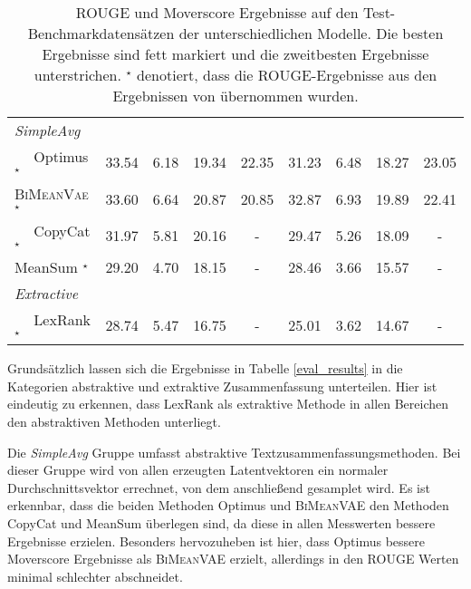 \begin{table}[!h]
\begin{tabular}{@{}lcccccccc@{}}
    \textit{SimpleAvg}         &         &         &        &      &  &        &        \\
    $\quad$ Optimus  $^{\star}$          & 33.54   & 6.18    & 19.34 & 22.35& 31.23  & 6.48   & 18.27 & 23.05\\
    $\quad$ \textsc{BiMeanVae}$^{\star}$ & 33.60   & 6.64    & 20.87 & 20.85& 32.87  & 6.93   & 19.89 & 22.41\\
    $\quad$ CopyCat  $^{\star}$          & 31.97   & 5.81    & 20.16 &- & 29.47  & 5.26   & 18.09 & -\\ 
    $\quad$ MeanSum  $^{\star}$          & 29.20   & 4.70    & 18.15 & -& 28.46  & 3.66   & 15.57 & -\\ \midrule
    \textit{Extractive}        &         &         &        &      &  &        &  &      \\
    $\quad$ LexRank  $^{\star}$          & 28.74   & 5.47    & 16.75 & -& 25.01  & 3.62   & 14.67 & -\\ \bottomrule
    \end{tabular}
    \caption{ROUGE und Moverscore Ergebnisse auf den Test-Benchmarkdatensätzen der unterschiedlichen Modelle. Die besten Ergebnisse sind fett markiert und die zweitbesten Ergebnisse unterstrichen.
    $^{\star}$ denotiert, dass die ROUGE-Ergebnisse aus den Ergebnissen von \citep{coop} übernommen wurden.
    }
\end{table}

Grundsätzlich lassen sich die Ergebnisse in Tabelle \ref{eval_results} in die Kategorien abstraktive und extraktive Zusammenfassung unterteilen.
Hier ist eindeutig zu erkennen, dass LexRank als extraktive Methode in allen Bereichen den abstraktiven Methoden unterliegt.

Die \textit{SimpleAvg} Gruppe umfasst abstraktive Textzusammenfassungsmethoden. 
Bei dieser Gruppe wird von allen erzeugten Latentvektoren ein normaler Durchschnittsvektor errechnet, von dem anschließend gesamplet wird.
Es ist erkennbar, dass die beiden Methoden Optimus und \textsc{BiMeanVAE} den Methoden CopyCat und MeanSum überlegen sind, da diese in allen Messwerten bessere Ergebnisse erzielen.
Besonders hervozuheben ist hier, dass Optimus bessere Moverscore Ergebnisse als \textsc{BiMeanVAE} erzielt, allerdings in den ROUGE Werten minimal schlechter abschneidet.

